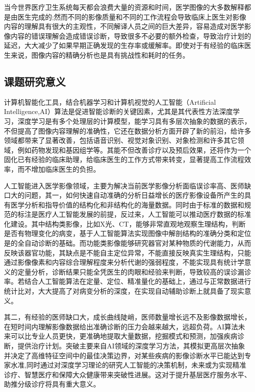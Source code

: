 当今世界医疗卫生系统每天都会浪费大量的资源和时间，医学图像的大多数解释都是由医生完成的;然而不同的影像质量和不同的工作流程会导致临床上医生对影像内容的理解具有很大的主观性，不同解译人员之间的巨大差异，容易造成对医学影像内容的错误理解会造成错误诊断，导致很多不必要的额外检查，导致治疗计划的延迟，大大减少了如果早期正确发现的生存率或缓解率。即使对于有经验的临床医生来说，图像内容的精确分析也是具有挑战性和耗时的任务。


\subsection{课题研究意义}

计算机智能化工具，结合机器学习和计算机视觉的人工智能（Artificial Intelligence,AI）算法是促进智能诊断的关键因素，尤其是其代表性方法深度学习，深度学习是有多个处理层的计算模型，能学习具有多层次抽象的数据的表示，不但提高了图像内容理解的准确性，它还在数据分析方面开辟了新的前沿，给许多领域都带来了显著改善，包括语音识别、视觉对象识别、对象检测和许多其它领域，例如药物发现和基因组学等。其能不但改善诊疗以及预后效果，还将作为一个固化已有经验的临床助理，给临床医生的工作方式带来转变，显著提高工作流程效率，而不增加临床医生的负担。

人工智能进入医学影像领域，主要为解决当前医学影像分析面临误诊率高、医师缺口大的问题，其一，如何快速自动准确的分析日益增长的医疗影像设备所产生的具有医学分析和指导价值的结构化和非结构化的海量数据。同时由于标准的数据和规范的标注是医疗人工智能发展的前提，反过来，人工智能可以推动医疗数据的标准化建设。其中结构类影像，比如X光、CT，能够非常直观地观察生理结构，判断是否有物理变化的病变，基于人工智能算法实现图像中解剖结构的准确分类和定位是的全自动诊断的基础。而功能类影像能够研究器官对某种物质的代谢能力，从而反映该器官功能，其缺点是不能自主定位异常，不能直接反映真实生理结构，只能通过影像像素和内容综合理解程度来分析代谢的强弱程度，不能实现具有统计学意义的定量分析，诊断结果只能全凭医生的肉眼和经验来判断，导致较高的误诊漏诊率。若结合人工智能算法在定量、定位、精准量化的基础上，通过与正常数据进行统计比对，大大提高了对病变分析的深度，在实现自动辅助诊断上就具备了现实意义。

其二，有经验的医师缺口大，成长曲线陡峭，医师数量增长远不及影像数据增长，在短时间内理解影像数据给出准确诊断的压力会越来越大，远超负荷。AI算法未来可以比专业人员更快，更准确地提取大量数据，挖掘模式和预测，加强疾病诊断，提供治疗计划。突破主要来自AI领域的深度学习方法，其模拟更高层次抽象并决定了高维特征空间中的最佳决策边界，对某些疾病的影像诊断水平已能达到专家水准,同时通过对深度学习理论的研究人工智能的决策机制，未来或为实现精准诊疗、智慧医疗和保障大众健康带来突破性进展。这对于提升基层医疗服务水平、助推分级诊疗将具有重大意义。

